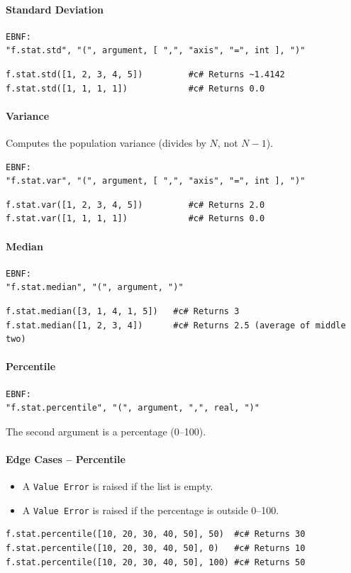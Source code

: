 \paragraph{Standard Deviation}
\begin{verbatim}
EBNF:
"f.stat.std", "(", argument, [ ",", "axis", "=", int ], ")"
\end{verbatim}
\begin{verbatim}
f.stat.std([1, 2, 3, 4, 5])         #c# Returns ~1.4142
f.stat.std([1, 1, 1, 1])            #c# Returns 0.0
\end{verbatim}

\paragraph{Variance}
Computes the population variance (divides by $N$, not $N-1$).
\begin{verbatim}
EBNF:
"f.stat.var", "(", argument, [ ",", "axis", "=", int ], ")"
\end{verbatim}
\begin{verbatim}
f.stat.var([1, 2, 3, 4, 5])         #c# Returns 2.0
f.stat.var([1, 1, 1, 1])            #c# Returns 0.0
\end{verbatim}

\paragraph{Median}
\begin{verbatim}
EBNF:
"f.stat.median", "(", argument, ")"
\end{verbatim}
\begin{verbatim}
f.stat.median([3, 1, 4, 1, 5])   #c# Returns 3
f.stat.median([1, 2, 3, 4])      #c# Returns 2.5 (average of middle two)
\end{verbatim}

\paragraph{Percentile}
\begin{verbatim}
EBNF:
"f.stat.percentile", "(", argument, ",", real, ")"
\end{verbatim}
The second argument is a percentage (0--100).

\paragraph{Edge Cases -- Percentile}
\begin{itemize}
\item A \texttt{Value Error} is raised if the list is empty.
\item A \texttt{Value Error} is raised if the percentage is outside 0--100.
\end{itemize}
\begin{verbatim}
f.stat.percentile([10, 20, 30, 40, 50], 50)  #c# Returns 30
f.stat.percentile([10, 20, 30, 40, 50], 0)   #c# Returns 10
f.stat.percentile([10, 20, 30, 40, 50], 100) #c# Returns 50
\end{verbatim}

